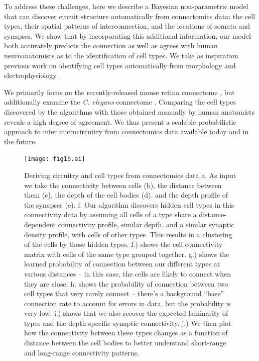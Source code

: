 \documentclass{article}
\begin{document}
To address these challenges, here we describe a Bayesian non-parametric
model that can discover circuit structure automatically from
connectomics data: the cell types, their spatial patterns of
interconnection, and the locations of somata and synapses. We show
that by incorporating this additional information, our model both
accurately predicts the connection as well as agrees with human
neuroanatomists as to the identification of cell types. We take as
inspiration previous work on identifying cell types automatically from
morphology \autocite{Guerra2011} and electrophysiology
\autocite{Druckmann2013}. 

We primarily focus on the recently-released mouse retina connectome
\autocite{Helmstaedter2013}, but additionally examine the \textit{C. elegans}
connectome \autocite{White1986}.  Comparing the cell types discovered
by the algorithms with those obtained manually by human anatomists
reveals a high degree of agreement. We thus present a scalable
probabilistic approach to infer microcircuitry from connectomics data
available today and in the future.

\begin{figure}
  \centering 
  \centerline{\texttt{[image: fig1b.ai]}}
  \caption{Deriving circuitry and cell types from connectomics data
    a. As input we take the connectivity between cells (b), the
    distance between them (c), the depth of the cell bodies (d), and
    the depth profile of the synapses (e). f. Our algorithm discovers
    hidden cell types in this connectivity data by assuming all cells
    of a type share a distance-dependent connectivity profile, similar
    depth, and a similar synaptic density profile, with cells of other
    types.  This results in a clustering of the cells by those hidden
    types. f.) shows the cell connectivity matrix with cells of the
    same type grouped together. g.) shows the learned probability of
    connection between our different types at various distances -- in
    this case, the cells are likely to connect when they are
    close. h. shows the probability of connection between two cell
    types that very rarely connect -- there's a background ``base''
    connection rate to account for errors in data, but the probability
    is very low.  i.) shows that we also recover the expected
    laminarity of types and the depth-specific synaptic
    connectivity. j.) We then plot how the connectivity between these
    types changes as a function of distance between the cell bodies to
    better understand short-range and long-range connectivity
    patterns. }


\label{fig:overview}
\end{figure}
\end{document}
